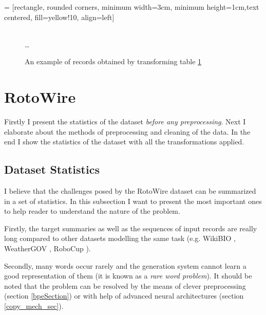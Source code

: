  = [rectangle, rounded corners, minimum width=3cm, minimum height=1cm,text centered, fill=yellow!10, align=left]

\begin{figure}[!h]
    \centering
    \usetikzlibrary{shapes.multipart}
    \\ \dots
    \caption{An example of records obtained by transforming table \ref{ex_seq_rec}} \label{ex_seq_rec}
\end{figure}

\section{RotoWire} \label{rotowire_preproc_section}

Firstly I present the statistics of the dataset \emph{before any preprocessing}. Next I elaborate about the methods of preprocessing and cleaning of the data. In the end I show the statistics of the dataset with all the transformations applied.

\subsection{Dataset Statistics} \label{assumptions_ref}

I believe that the challenges posed by the RotoWire dataset can be summarized in a set of statistics. In this subsection I want to present the most important ones to help reader to understand the nature of the problem. 

Firstly, the target summaries as well as the sequences of input records are really long compared to other datasets modelling the same task (e.g. WikiBIO \citep{lebret2016neural}, WeatherGOV \citep{liang-etal-2009-learning}, RoboCup \citep{chen2008robocup}).

Secondly, many words occur rarely and the generation system cannot learn a good representation of them (it is known as a \emph{rare word problem}). It should be noted that the problem can be resolved by the means of clever preprocessing (section \ref{bpeSection}) or with help of advanced neural architectures (section \ref{copy_mech_sec}).

